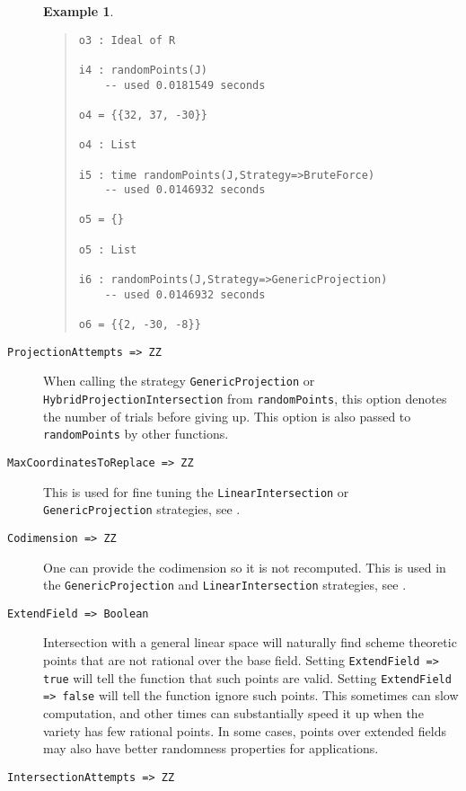 \documentclass[11pt]{amsart}
\theoremstyle{definition}
\newtheorem{example}{Example}[section]
\begin{document}
\begin{description}
\begin{example}
{\begin{quote}
\begin{verbatim}
o3 : Ideal of R

i4 : randomPoints(J)
    -- used 0.0181549 seconds
    
o4 = {{32, 37, -30}}

o4 : List

i5 : time randomPoints(J,Strategy=>BruteForce)
    -- used 0.0146932 seconds
    
o5 = {}

o5 : List

i6 : randomPoints(J,Strategy=>GenericProjection)
    -- used 0.0146932 seconds
    
o6 = {{2, -30, -8}}
        \end{verbatim}
    \end{quote}
        }
    \end{example}%
    \vspace{-1em}
    \item[\tt ProjectionAttempts => ZZ] 

    When calling the strategy {\tt GenericProjection} or \\
    {\tt HybridProjectionIntersection} from {\tt randomPoints}, this option denotes the number of trials before giving up.  This option is also passed to {\tt randomPoints} by other functions.

    \item[\tt MaxCoordinatesToReplace => ZZ] This is used for fine tuning the {\tt LinearIntersection} or {\tt GenericProjection} strategies, see .
    \item[\tt Codimension => ZZ] One can provide the codimension so it is not recomputed.  This is used in the {\tt GenericProjection} and {\tt LinearIntersection} strategies, see . 

    \item[\tt ExtendField => Boolean] 

    Intersection with a general linear space will naturally find scheme theoretic points that are not rational over the base field.  
    Setting {\tt ExtendField => true} will tell the function that such points are valid.  Setting {\tt ExtendField => false} will tell the function ignore such points.  This sometimes can slow computation, and other times can substantially speed it up when the variety has few rational points.  In some cases, points over extended fields may also have better randomness properties for applications.


    \item[\tt IntersectionAttempts => ZZ]


\end{description}
\end{document}
